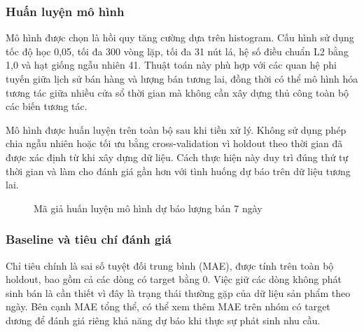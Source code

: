 \subsubsection{Huấn luyện mô hình}

Mô hình được chọn là hồi quy tăng cường dựa trên histogram. Cấu hình sử dụng tốc độ học 0,05, tối đa 300 vòng lặp, tối đa 31 nút lá, hệ số điều chuẩn L2 bằng 1,0 và hạt giống ngẫu nhiên 41. Thuật toán này phù hợp với các quan hệ phi tuyến giữa lịch sử bán hàng và lượng bán tương lai, đồng thời có thể mô hình hóa tương tác giữa nhiều cửa sổ thời gian mà không cần xây dựng thủ công toàn bộ các biến tương tác.

Mô hình được huấn luyện trên toàn bộ  sau khi tiền xử lý. Không sử dụng phép chia ngẫu nhiên hoặc tối ưu bằng cross-validation vì holdout theo thời gian đã được xác định từ khi xây dựng dữ liệu. Cách thực hiện này duy trì đúng thứ tự thời gian và làm cho đánh giá gần hơn với tình huống dự báo trên dữ liệu tương lai.

\begin{figure}[H]\centering
{}
\caption{Mã giả huấn luyện mô hình dự báo lượng bán 7 ngày}
\label{fig:pseudo-demand-7d}
\end{figure}

\subsubsection{Baseline và tiêu chí đánh giá}

Chỉ tiêu chính là sai số tuyệt đối trung bình (MAE), được tính trên toàn bộ holdout, bao gồm cả các dòng có target bằng 0. Việc giữ các dòng không phát sinh bán là cần thiết vì đây là trạng thái thường gặp của dữ liệu sản phẩm theo ngày. Bên cạnh MAE tổng thể, có thể xem thêm MAE trên nhóm có target dương để đánh giá riêng khả năng dự báo khi thực sự phát sinh nhu cầu.

